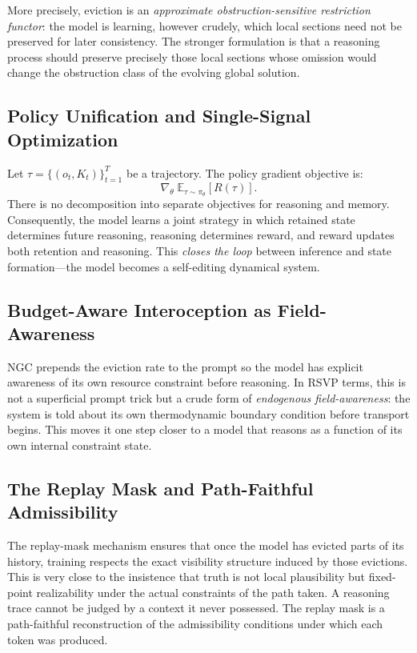 \documentclass[11pt, letterpaper]{article}
\theoremstyle{plain}
\theoremstyle{definition}
\theoremstyle{remark}
\newcommand{\grad}{\nabla}
\begin{document}
More precisely, eviction is an \emph{approximate obstruction-sensitive restriction
functor}: the model is learning, however crudely, which local sections need not be
preserved for later consistency. The stronger formulation is that a reasoning process
should preserve precisely those local sections whose omission would change the
obstruction class of the evolving global solution.

\subsection{Policy Unification and Single-Signal Optimization}

Let $\tau = \{(o_t, K_t)\}_{t=1}^T$ be a trajectory. The policy gradient objective
is:
\[
  \grad_\theta\; \mathbb{E}_{\tau \sim \pi_\theta}[R(\tau)].
\]
There is no decomposition into separate objectives for reasoning and memory.
Consequently, the model learns a joint strategy in which retained state determines
future reasoning, reasoning determines reward, and reward updates both retention and
reasoning. This \emph{closes the loop} between inference and state formation---the
model becomes a self-editing dynamical system.

\subsection{Budget-Aware Interoception as Field-Awareness}

NGC prepends the eviction rate to the prompt so the model has explicit awareness of its
own resource constraint before reasoning. In RSVP terms, this is not a superficial
prompt trick but a crude form of \emph{endogenous field-awareness}: the system is told
about its own thermodynamic boundary condition before transport begins. This moves it
one step closer to a model that reasons as a function of its own internal constraint
state.

\subsection{The Replay Mask and Path-Faithful Admissibility}

The replay-mask mechanism ensures that once the model has evicted parts of its history,
training respects the exact visibility structure induced by those evictions. This is
very close to the insistence that truth is not local plausibility but fixed-point
realizability under the actual constraints of the path taken. A reasoning trace cannot
be judged by a context it never possessed. The replay mask is a path-faithful
reconstruction of the admissibility conditions under which each token was produced.
\end{document}
